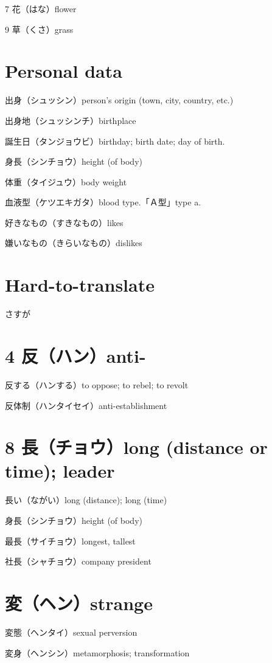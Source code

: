 7 花（はな）flower

9 草（くさ）grass

\section{Personal data}

出身（シュッシン）person's origin (town, city, country, etc.)

出身地（シュッシンチ）birthplace

誕生日（タンジョウビ）birthday; birth date; day of birth.

身長（シンチョウ）height (of body)

体重（タイジュウ）body weight

血液型（ケツエキガタ）blood type.「Ａ型」type a.

好きなもの（すきなもの）likes

嫌いなもの（きらいなもの）dislikes

\section{Hard-to-translate}

さすが

\section{4 反（ハン）anti-}

反する（ハンする）to oppose; to rebel; to revolt

反体制（ハンタイセイ）anti-establishment

\section{8 長（チョウ）long (distance or time); leader}

長い（ながい）long (distance); long (time)

身長（シンチョウ）height (of body)

最長（サイチョウ）longest, tallest

社長（シャチョウ）company president

\section{変（ヘン）strange}

変態（ヘンタイ）sexual perversion

変身（ヘンシン）metamorphosis; transformation

